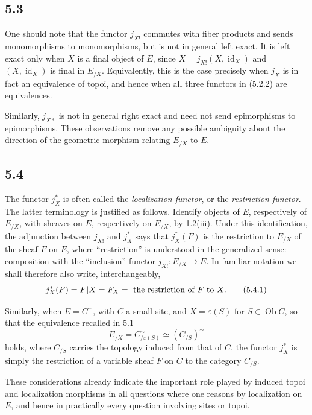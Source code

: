 \documentclass[11pt]{article}
\begin{document}
\subsection*{5.3}
One should note that the functor \(j_{X!}\) commutes with fiber products and sends monomorphisms to monomorphisms, but is not in general left exact. It is left exact only when \(X\) is a final object of \(E\), since \(X=j_{X!}(X,\operatorname{id}_X)\) and \((X,\operatorname{id}_X)\) is final in \(E_{/X}\). Equivalently, this is the case precisely when \(j_X\) is in fact an equivalence of topoi, and hence when all three functors in (5.2.2) are equivalences.

Similarly, \(j_{X*}\) is not in general right exact and need not send epimorphisms to epimorphisms. These observations remove any possible ambiguity about the direction of the geometric morphism relating \(E_{/X}\) to \(E\).

\subsection*{5.4}
The functor \(j_X^*\) is often called the \emph{localization functor}, or the \emph{restriction functor}. The latter terminology is justified as follows. Identify objects of \(E\), respectively of \(E_{/X}\), with sheaves on \(E\), respectively on \(E_{/X}\), by 1.2(iii). Under this identification, the adjunction between \(j_{X!}\) and \(j_X^*\) says that \(j_X^*(F)\) is the restriction to \(E_{/X}\) of the sheaf \(F\) on \(E\), where ``restriction'' is understood in the generalized sense: composition with the ``inclusion'' functor \(j_{X!}:E_{/X}\to E\). In familiar notation we shall therefore also write, interchangeably,
\begin{equation*}
j_X^*(F)=F|X=F_X=\hbox{ the restriction of }F\hbox{ to }X.\tag{5.4.1}
\end{equation*}

Similarly, when \(E=C^{\sim}\), with \(C\) a small site, and \(X=\varepsilon(S)\) for \(S\in\operatorname{Ob}C\), so that the equivalence recalled in 5.1
\[
E_{/X}=C^{\sim}_{/\varepsilon(S)}\simeq (C_{/S})^{\sim}
\]
holds, where \(C_{/S}\) carries the topology induced from that of \(C\), the functor \(j_X^*\) is simply the restriction of a variable sheaf \(F\) on \(C\) to the category \(C_{/S}\).

These considerations already indicate the important role played by induced topoi and localization morphisms in all questions where one reasons by localization on \(E\), and hence in practically every question involving sites or topoi.
\end{document}
